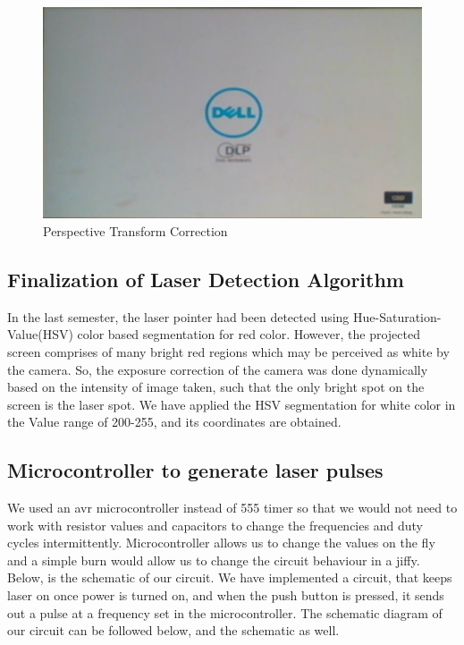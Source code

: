 \documentclass[12pt, a4paper]{article}
\begin{document}
\begin{figure}[htp]
	\centering
	\includegraphics[scale=0.20]{result.png}
	\caption{Perspective Transform Correction}
	\label{}
\end{figure}

	
\subsection{Finalization of Laser Detection Algorithm}
	In the last semester, the laser pointer had been detected using Hue-Saturation-Value(HSV) color based segmentation for red color. However, the projected screen comprises of many bright red regions which may be perceived  as white by the camera. So, the exposure correction of the camera was done dynamically based on the intensity of image taken, such that the only bright spot on the screen is the laser spot. We have applied the HSV segmentation for white color in the Value range of 200-255, and its coordinates are obtained. 
	
\subsection{Microcontroller to generate laser pulses}

	We used an avr microcontroller instead of 555 timer so that we would not need to work with resistor values and capacitors to change the frequencies and duty cycles intermittently. Microcontroller allows us to change the values on the fly and a simple burn would allow us to change the circuit behaviour in a jiffy. Below, is the schematic of our circuit. We have implemented a circuit, that keeps laser on once power is turned on, and when the push button is pressed, it sends out a pulse at a frequency set in the microcontroller. The schematic diagram of our circuit can be followed below, and the schematic as well.
	
\end{document}
